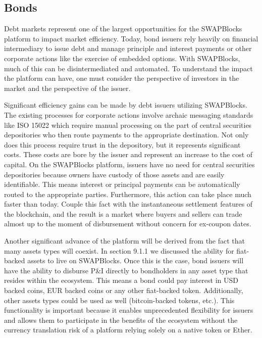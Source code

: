 \documentclass[12pt]{article}
\begin{document}
\subsection{Bonds}
Debt markets represent one of the largest opportunities for the SWAPBlocks platform to impact market efficiency. 
Today, bond issuers rely heavily on financial intermediary to issue debt and manage principle and interest payments 
or other corporate actions like the exercise of embedded options. With SWAPBlocks, much of this can be disintermediated 
and automated. To understand the impact the platform can have, one must consider the perspective of investors in 
the market and the perspective of the issuer.

Significant efficiency gains can be made by debt issuers utilizing SWAPBlocks. The existing processes for 
corporate actions involve archaic messaging standards like ISO 15022 which require manual processing on the part of 
central securities depositories who then route payments to the appropriate destination. Not only does this process 
require trust in the depository, but it represents significant costs. These costs are bore by the issuer and represent 
an increase to the cost of capital. On the SWAPBlocks platform, issuers have no need for central securities depositories 
because owners have custody of those assets and are easily identifiable. This means interest or principal payments can be 
automatically routed to the appropriate parties. Furthermore, this action can take place much faster than today. Couple 
this fact with the instantaneous settlement features of the blockchain, and the result is a market where buyers 
and sellers can trade almost up to the moment of disbursement without concern for ex-coupon dates.

Another significant advance of the platform will be derived from the fact that many assets types will coexist. In 
section 9.1.1 we discussed the ability for fiat-backed assets to live on SWAPBlocks. Once this is the case, bond 
issuers will have the ability to disburse P\&I directly to bondholders in any asset type that resides within the ecosystem. 
This means a bond could pay interest in USD backed coins, EUR backed coins or any other fiat-backed token. 
Additionally, other assets types could be used as well (bitcoin-backed tokens, etc.). This functionality is important 
because it enables unprecedented flexibility for issuers and allows them to participate in the benefits of the 
ecosystem without the currency translation risk of a platform relying solely on a native token or Ether.
\end{document}
